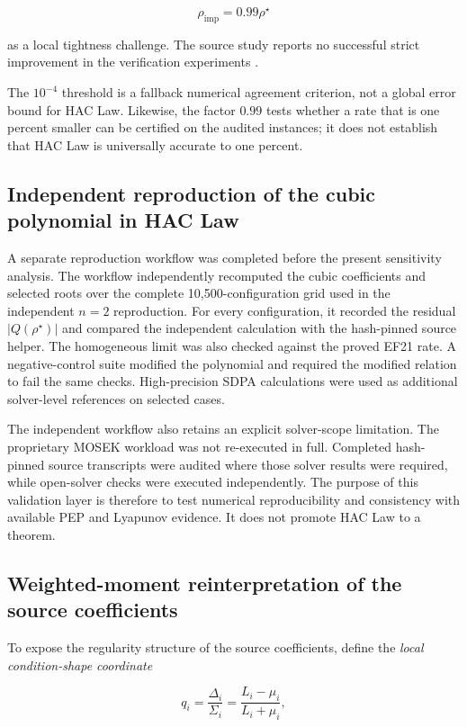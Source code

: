 \[
\rho_{\mathrm{imp}}=0.99\rho^\star
\]

as a local tightness challenge. The source study reports no successful strict
improvement in the verification experiments \citep{thomsen2026tight}.

The $10^{-4}$ threshold is a fallback numerical agreement criterion, not a
global error bound for HAC Law. Likewise, the factor $0.99$ tests
whether a rate that is one percent smaller can be certified on the audited
instances; it does not establish that HAC Law is universally
accurate to one percent.

\subsection{Independent reproduction of the cubic polynomial in HAC Law}

A separate reproduction workflow was completed before the present sensitivity analysis. The workflow independently recomputed the cubic coefficients and selected roots over the complete 10,500-configuration grid used in the independent $n=2$ reproduction. For every configuration, it recorded the residual $|Q(\rho^\star)|$ and compared the independent calculation with the hash-pinned source helper. The homogeneous limit was also checked against the proved EF21 rate. A negative-control suite modified the polynomial and required the modified relation to fail the same checks. High-precision SDPA calculations were used as additional solver-level references on selected cases.

The independent workflow also retains an explicit solver-scope limitation. The proprietary MOSEK workload was not re-executed in full. Completed hash-pinned source transcripts were audited where those solver results were required, while open-solver checks were executed independently. The purpose of this validation layer is therefore to test numerical reproducibility and consistency with available PEP and Lyapunov evidence. It does not promote HAC Law to a theorem.

\subsection{Weighted-moment reinterpretation of the source coefficients}\label{sec:weighted-moment}

To expose the regularity structure of the source coefficients, define the \emph{local condition-shape coordinate}

\[
q_i=
\frac{\Delta_i}{\Sigma_i}
=
\frac{L_i-\mu_i}{L_i+\mu_i},
\]

